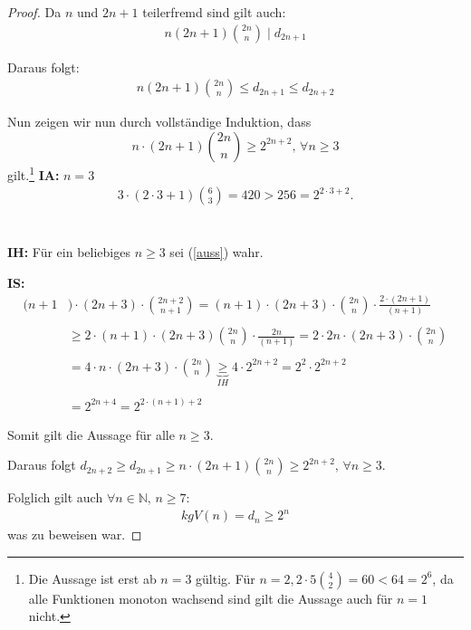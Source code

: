 \documentclass[12pt,oneside]{article}
\theoremstyle{remark}
\theoremstyle{definition}
\begin{document}
\begin{proof}
Da $n $ und $2n + 1$ teilerfremd sind gilt auch:
\begin{align*}
    n(2n + 1) {2n \choose n} \mid d_{2n + 1}
\end{align*}

Daraus folgt:
\begin{align*}
    n (2n + 1){2n \choose n} \leq d_{2n + 1} \leq d_{2n + 2}
\end{align*}

Nun zeigen wir nun durch vollständige Induktion, dass 
\begin{equation}\label{auss}
    n \cdot (2n + 1) {2n \choose n} \geq 2^{2n + 2}, \, \forall n \geq 3
\end{equation}
gilt.\footnote{Die Aussage ist erst ab $n = 3$ gültig. Für $n = 2, 2 \cdot 5 {4 \choose 2} = 60 < 64 = 2^{6} $, da alle Funktionen monoton wachsend sind gilt die Aussage auch für $n = 1$ nicht.}\newline\newline
\textbf{IA:} $n = 3$
\begin{align*}
    3 \cdot (2 \cdot 3 + 1) { 6 \choose 3} = 420 > 256 = 2^{2 \cdot 3 + 2}.
\end{align*}
\\
\\
\textbf{IH:} Für ein beliebiges $n \geq 3$ sei (\ref{auss}) wahr.\newline\newline

\textbf{IS:}
\begin{align*}
    (n + 1&) \cdot (2n + 3) \cdot {2n + 2 \choose n + 1} =(n + 1) \cdot (2n + 3) \cdot {2n \choose n} \cdot \frac{2 \cdot (2n + 1)}{(n + 1)} \\
    \\
    &\geq 2 \cdot (n + 1) \cdot (2n + 3) {2n \choose n} \cdot \frac{2n}{(n + 1)} = 2 \cdot 2n \cdot (2n + 3) \cdot {2n \choose n} \\
    \\ 
    &= 4 \cdot n \cdot (2n + 3) \cdot {2n \choose n} \underbrace{\geq}_{IH} 4 \cdot 2^{2n + 2} = 2^2 \cdot 2^{2n + 2}\\
    \\
    &= 2^{2n + 4} = 2^{2 \cdot (n + 1) + 2} 
\end{align*}

Somit gilt die Aussage für alle $n \geq 3$.\newline\newline 

Daraus folgt $d_{2n + 2} \geq d_{2n + 1} \geq  n \cdot (2n + 1) {2n \choose n} \geq 2^{2n + 2}, \, \forall n \geq 3$.\newline\newline

Folglich gilt auch $\forall n \in \mathbb{N}, \, n \geq 7$:
\begin{align*}
    kgV(n)= d_{n} \geq 2^{n}
\end{align*}
was zu beweisen war.
\end{proof}
\end{document}

